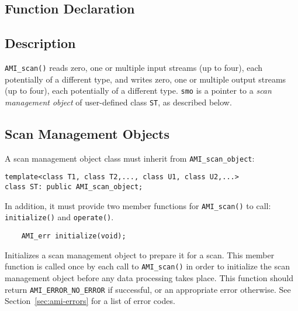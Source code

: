 \subsection{Function Declaration}
  \btabb
     {}
  \etabb

\subsection{Description}

\lstinline|AMI_scan()| reads zero, one or multiple input streams (up
to four), each potentially of a different type, and writes zero, one
or multiple output streams (up to four), each potentially of a
different type.  \lstinline|smo| is a pointer to a {\em scan
  management object} of user-defined class \lstinline|ST|, as
described below.

\subsection{Scan Management Objects}


A scan management object class must inherit from \lstinline|AMI_scan_object|:
\begin{lstlisting}
template<class T1, class T2,..., class U1, class U2,...>
class ST: public AMI_scan_object;
\end{lstlisting}
In addition, it must provide two member
functions for \lstinline|AMI_scan()| to call: \lstinline|initialize()| and \lstinline|operate()|.
\begin{lstlisting}
    AMI_err initialize(void);
\end{lstlisting}
    Initializes a scan management object to prepare
    it for a scan.  This member function is called once by
    each call to \lstinline|AMI_scan()| in order to initialize
    the scan management object before any data processing
    takes place.  This function should return
    \lstinline|AMI_ERROR_NO_ERROR| if successful, or an
    appropriate error otherwise. See
    Section~\ref{sec:ami-errors} for a list of error codes.
    
